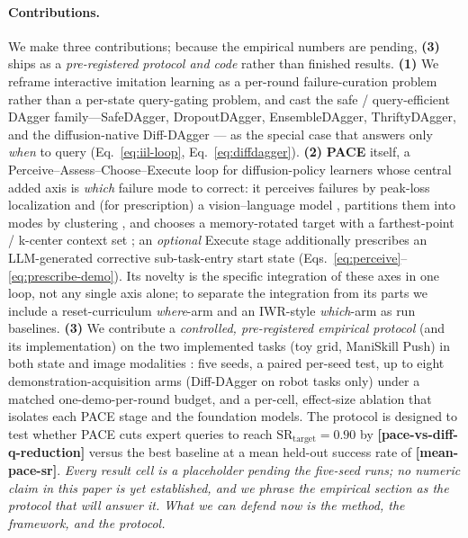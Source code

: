 \documentclass[letterpaper]{article} %
\newcommand{\PH}[1]{{\color{red}\textbf{[#1]}}}
\begin{document}
\paragraph{Contributions.}
We make three contributions; because the empirical numbers are pending,
\textbf{(3)} ships as a \emph{pre-registered protocol and code} rather than
finished results.
\textbf{(1)} We reframe interactive imitation learning
\cite{ross2011dagger,celemin2022iil} as a per-round failure-curation problem
rather than a per-state query-gating problem, and cast the safe /
query-efficient DAgger family---SafeDAgger, DropoutDAgger, EnsembleDAgger,
ThriftyDAgger, and the diffusion-native Diff-DAgger
\cite{zhang2017safedagger,menda2017dropoutdagger,menda2019ensembledagger,hoque2021thriftydagger,lee2025diffdagger}---%
as the special case that answers only \emph{when} to query
(Eq.~\ref{eq:iil-loop}, Eq.~\ref{eq:diffdagger}).
\textbf{(2)} \textbf{PACE} itself, a Perceive--Assess--Choose--Execute loop
for diffusion-policy learners \cite{chi2023diffusionpolicy,ho2020ddpm} whose
central added axis is \emph{which} failure mode to correct: it perceives failures
by peak-loss localization and (for prescription) a vision--language model
\cite{bai2025qwen3vl,liu2023reflect,duan2025aha}, partitions them into modes by
clustering \cite{lloyd1982kmeans}, and chooses a memory-rotated target with a
farthest-point / k-center context set \cite{sener2018coreset,eldar1997fps}; an
\emph{optional} Execute stage additionally prescribes an LLM-generated corrective
sub-task-entry start state
\cite{yang2025qwen3,florensa2017reversecurriculum,eysenbach2018leavenotrace}
(Eqs.~\ref{eq:perceive}--\ref{eq:prescribe-demo}). Its novelty is the specific
integration of these axes in one loop, not any single axis alone; to separate the
integration from its parts we include a reset-curriculum \emph{where}-arm and an
IWR-style \emph{which}-arm as run baselines.
\textbf{(3)} We contribute a \emph{controlled, pre-registered empirical protocol}
(and its implementation) on the two implemented tasks
(toy grid, ManiSkill Push) in both state and image modalities
\cite{tao2024maniskill3,florence2021implicitbc,nair2022r3m}: five seeds, a paired
per-seed test, up to eight demonstration-acquisition arms (Diff-DAgger on robot
tasks only) under a matched one-demo-per-round budget, and a per-cell,
effect-size ablation that isolates each PACE stage and the foundation models.
The protocol is designed to test whether PACE cuts
expert queries to reach $\mathrm{SR}_{\mathrm{target}}{=}0.90$ by
\PH{pace-vs-diff-q-reduction} versus the best baseline at a mean held-out success
rate of \PH{mean-pace-sr}. \emph{Every result
cell is a placeholder pending the five-seed runs; no numeric claim in this paper
is yet established, and we phrase the empirical section as the protocol that will
answer it. What we can defend now is the method, the framework, and the protocol.}
\end{document}
